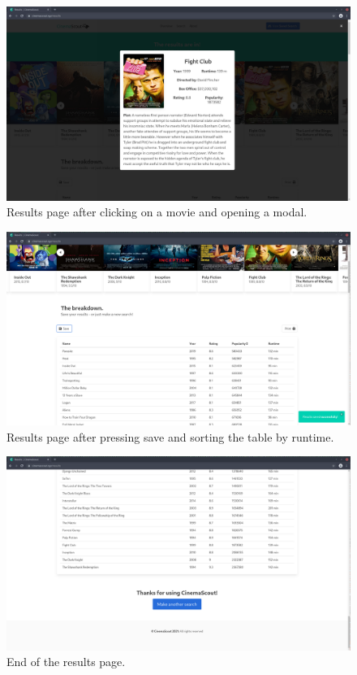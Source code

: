 \documentclass{article}
\begin{document}
\begin{figure}[H]
\includegraphics[width=\columnwidth]{res/results_1.png}
\caption{Results page after clicking on a movie and opening a modal.}
\end{figure}
\begin{figure}[H]
\includegraphics[width=\columnwidth]{res/results_2.png}
\caption{Results page after pressing save and sorting the table by runtime.}
\end{figure}
\begin{figure}[H]
\includegraphics[width=\columnwidth]{res/results_3.png}
\caption{End of the results page.}
\end{figure}
\end{document}
